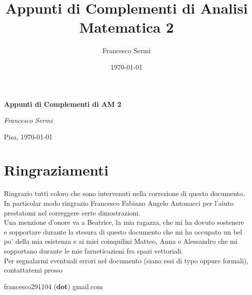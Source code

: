 \documentclass[openany, italian]{book}
\title{Appunti di Complementi di Analisi Matematica 2}
\author{Francesco Sermi}
\date{\today}
\begin{document}
	\begin{titlepage}
	\centering
	\vspace*{3cm}
	{\huge\bfseries Appunti di Complementi di AM 2 \par}
	\vspace{2cm}
	{\Large\itshape Francesco Sermi\par}
	\vfill
	\vfill	
	{\large \hfill Pisa, \today \par}
	\end{titlepage}
	\tableofcontents
	\chapter*{Ringraziamenti}
	Ringrazio tutti coloro che sono intervenuti nella correzione di questo documento. In particolar modo ringrazio Francesco Fabiano Angelo Antonacci per l'aiuto prestatomi nel correggere certe dimostrazioni. \\
	Una menzione d'onore va a Beatrice, la mia ragazza, che mi ha dovuto sostenere e sopportare durante la stesura di questo documento che mi ha occupato un bel po' della mia esistenza e ai miei coinquilini Matteo, Anna e Alessandro che mi sopportano durante le mie farneticazioni fra spazi vettoriali. \\
	Per segnalarmi eventuali errori nel documento (siano essi di typo oppure formali), contattatemi presso
	\begin{center}
		francesco291104 (\textbf{dot}) gmail.com
	\end{center}
	
\end{document}
